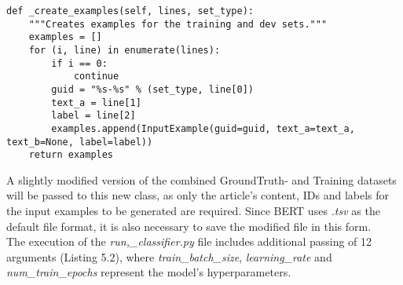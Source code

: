 \documentclass[a4paper, 11pt,titlepage,oneside,openany]{book}
\begin{document}
\newpage
\begin{lstlisting}[caption=Create\_examples in BERT]
def _create_examples(self, lines, set_type):
    """Creates examples for the training and dev sets."""
    examples = []
    for (i, line) in enumerate(lines):
        if i == 0:
            continue
        guid = "%s-%s" % (set_type, line[0])
        text_a = line[1]
        label = line[2]
        examples.append(InputExample(guid=guid, text_a=text_a, text_b=None, label=label))
    return examples
\end{lstlisting}
\indent A slightly modified version of the combined GroundTruth- and Training datasets will be passed to this new class, as only the article's content, IDs and labels for the input examples to be generated are required. Since BERT uses \textit{.tsv} as the default file format, it is also necessary to save the modified file in this form. \\
\noindent The execution of the \textit{run,\_classifier.py} file includes additional passing of 12 arguments (Listing 5.2), where \textit{train\_batch\_size}, \textit{learning\_rate} and \textit{num\_train\_epochs} represent the model's hyperparameters. 
\end{document}
